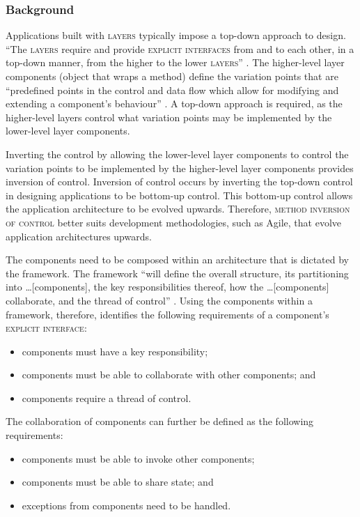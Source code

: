 \documentclass[prodmode]{style/acmlarge}
\begin{document}
\subsubsection*{Background}

Applications built with \textsc{layers} typically impose a top-down approach to
design.  ``The \textsc{layers} require and provide \textsc{explicit interfaces}
from and to each other, in a top-down manner, from the higher to the lower
\textsc{layers}'' \cite[p. 11]{ioc}.  The higher-level layer components (object
that wraps a method) define the variation points that are ``predefined points in
the control and data flow which allow for modifying and extending a component's
behaviour'' \cite[p. 5]{ioc}.  A top-down approach is required, as the
higher-level layers control what variation points may be implemented by the
lower-level layer components.

Inverting the control by allowing the lower-level layer components to control the
variation points to be implemented by the higher-level layer components provides
inversion of control.  Inversion of control occurs by inverting the top-down
control in designing applications to be bottom-up control.  This bottom-up
control allows the application architecture to be evolved upwards. Therefore,
\textsc{method inversion of control} better suits development methodologies, such as
Agile, that evolve application architectures upwards.

The components need to be composed within an architecture that is dictated by
the framework.  The framework ``will define the overall structure, its
partitioning into \ldots [components], the key responsibilities thereof, how the
\ldots [components] collaborate, and the thread of control'' \cite[p.26]{gof}.
Using the components within a framework, therefore, identifies the following
requirements of a component's \textsc{explicit interface}:
\begin{itemize}
  \item components must have a key responsibility;
  \item components must be able to collaborate with other components; and
  \item components require a thread of control.
\end{itemize}

The collaboration of components can further be defined as the following
requirements:
\begin{itemize}
  \item components must be able to invoke other components;
  \item components must be able to share state; and
  \item exceptions from components need to be handled.
\end{itemize}
\end{document}
